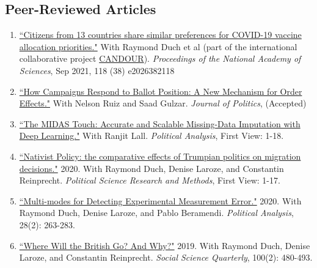 \documentclass[11pt, a4paper]{article}
\begin{document}
 \subsection*{Peer-Reviewed Articles}

 \begin{enumerate}

 \item \href{https://doi.org/10.1073/pnas.2026382118 }{``Citizens from 13 countries share similar preferences for COVID-19 vaccine allocation priorities."} With Raymond Duch et al (part of the international collaborative project \href{https://oxford-candour.com/}{CANDOUR}). \textit{Proceedings of the National Academy of Sciences}, Sep 2021, 118 (38) e2026382118

 \item \href{https://ts-robinson.com/publication/gulzar-how-campaigns-respond-2020/gulzar-how-campaigns-respond-2020.pdf}{``How Campaigns Respond to Ballot Position: A New Mechanism for Order Effects."} With Nelson Ruiz and Saad Gulzar. \textit{Journal of Politics}, (Accepted)

 \item \href{https://doi.org/10.1017/pan.2020.49}{``The MIDAS Touch: Accurate and Scalable Missing-Data Imputation with Deep Learning."} With Ranjit Lall. \textit{Political Analysis}, First View: 1-18.

 \item \href{https://doi.org/10.1017/psrm.2020.33}{``Nativist Policy: the comparative effects of Trumpian politics on migration decisions."} 2020. With Raymond Duch, Denise Laroze, and Constantin Reinprecht. \textit{Political Science Research and Methods}, First View: 1-17.

 \item \href{https://www.cambridge.org/core/journals/political-analysis/article/multimodes-for-detecting-experimental-measurement-error/37514FC46CF29C7B345DB9881E252150/share/7b059037b0da9182a33316d7f87b2de81b619592}{``Multi-modes for Detecting Experimental Measurement Error."} 2020. With Raymond Duch, Denise Laroze, and Pablo Beramendi. \textit{Political Analysis}, 28(2): 263-283.

 \item \href{https://doi.org/10.1111/ssqu.12584}{``Where Will the British Go? And Why?"} 2019. With Raymond Duch, Denise Laroze, and Constantin Reinprecht. \textit{Social Science Quarterly}, 100(2): 480-493. 

\end{enumerate}
\end{document}
